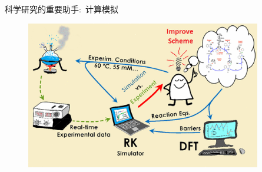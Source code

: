 \begin{frame}{科学研究的重要助手:~计算模拟}
\begin{figure}[h!]
\vspace*{-0.18in}
\centering
\includegraphics[height=2.55in,width=4.05in]{Figures/Schematic_Material-Design.png}
\label{Schematic_Material-Design}
\end{figure}
\end{frame}

